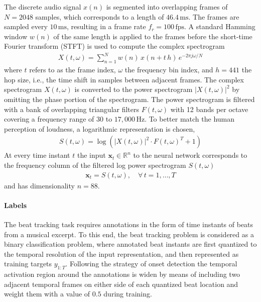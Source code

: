 \documentclass{scrartcl}
\begin{document}
The discrete audio signal $x(n)$ is segmented into overlapping frames of $N = 2048$ samples, which corresponds to a length of $46.4 \,\text{ms}$. The frames are sampled every $10 \,\text{ms}$, resulting in a frame rate $f_r = 100 \,\text{fps}$. A standard Hamming window $w(n)$ of the same length is applied to the frames before the short-time Fourier transform (STFT) is used to compute the complex spectrogram 
\begin{align}
X(t,\omega) = \sum_{n = 1}^{N} w(n) \, x(n + t\,h) \, e^{-2 \pi j \omega /N}
\end{align} 
where $t$ refers to as the frame index, $\omega$ the frequency bin index, and $h=441$ the hop size, i.e., the time shift in samples between adjacent frames. The complex spectrogram $X(t,\omega)$ is converted to the power spectrogram $|X(t,\omega)|^2$ by omitting the phase portion of the spectrogram. The power spectrogram is filtered with a bank of overlapping triangular filters $F(t,\omega)$ with 12 bands per octave covering a frequency range of $30$ to $17,000 \, \text{Hz}$. To better match the human perception of loudness, a logarithmic representation is chosen, 
\begin{align}
S(t,\omega) = \log \left( |X(t,\omega)|^2 \cdot F(t,\omega)^T + 1 \right)
\end{align} 
At every time instant $t$ the input  $\mathbf x_t \in \mathbb R^n$ to the neural network corresponds to the frequency column of the filtered log power spectrogram $S(t,\omega)$
\begin{align}
\mathbf x_t = S(t,\omega), \quad \forall\, t= 1,\dots,T
\end{align} 
and has dimensionality $n=88$.




\paragraph{Labels}
The beat tracking task requires annotations in the form of time instants of beats from a musical excerpt. To this end, the beat tracking problem is considered as a binary classification problem, where annotated beat instants are first quantized to the temporal resolution of the input representation, and then represented as training targets $y_{1:T}$. Following the strategy of onset detection \cite{Schluter2014} the temporal activation region around the annotations is widen by means of including two adjacent temporal frames on either side of each quantized beat location and weight them with a value of $0.5$ during training. 
\end{document}
